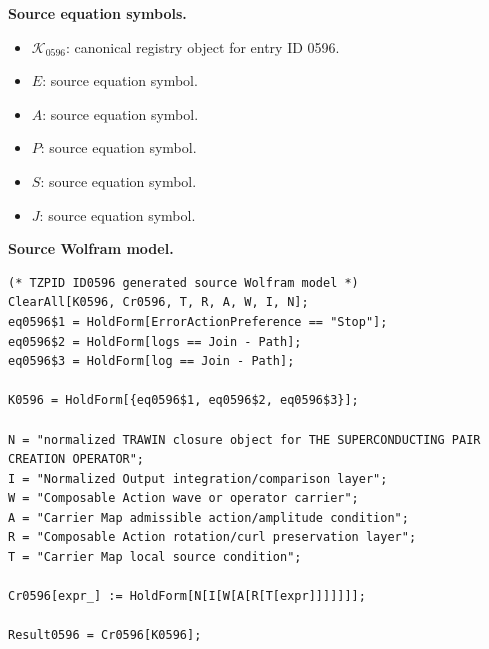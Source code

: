 \begin{minipage}[t]{0.49\linewidth}
\begingroup
\small
\raggedright
\textbf{Source equation symbols.}\par
\begin{itemize}[leftmargin=1.35em,itemsep=1pt,topsep=1pt,parsep=0pt]
    \item $\mathcal{K}_{0596}$: canonical registry object for entry ID 0596.
    \item $E$: source equation symbol.
    \item $A$: source equation symbol.
    \item $P$: source equation symbol.
    \item $S$: source equation symbol.
    \item $J$: source equation symbol.
\end{itemize}
\endgroup
\end{minipage}\hfill
\begin{minipage}[t]{0.47\linewidth}
\begingroup
\scriptsize
\raggedright
\textbf{Source Wolfram model.}\par
\begin{Verbatim}[fontsize=\tiny,breaklines=true,breakanywhere=true]
(* TZPID ID0596 generated source Wolfram model *)
ClearAll[K0596, Cr0596, T, R, A, W, I, N];
eq0596$1 = HoldForm[ErrorActionPreference == "Stop"];
eq0596$2 = HoldForm[logs == Join - Path];
eq0596$3 = HoldForm[log == Join - Path];

K0596 = HoldForm[{eq0596$1, eq0596$2, eq0596$3}];

N = "normalized TRAWIN closure object for THE SUPERCONDUCTING PAIR CREATION OPERATOR";
I = "Normalized Output integration/comparison layer";
W = "Composable Action wave or operator carrier";
A = "Carrier Map admissible action/amplitude condition";
R = "Composable Action rotation/curl preservation layer";
T = "Carrier Map local source condition";

Cr0596[expr_] := HoldForm[N[I[W[A[R[T[expr]]]]]]];

Result0596 = Cr0596[K0596];
\end{Verbatim}
\endgroup
\end{minipage}

